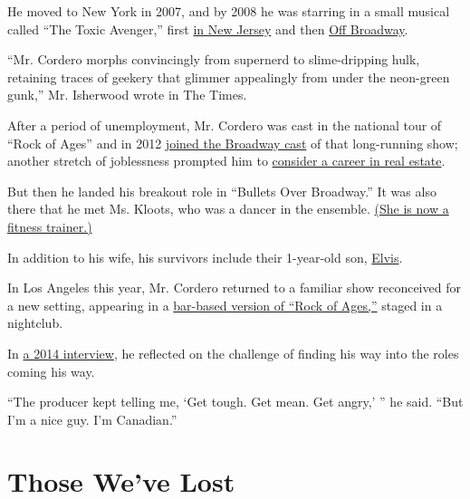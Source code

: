 He moved to New York in 2007, and by 2008 he was starring in a small
musical called ``The Toxic Avenger,'' first
\href{https://www.nytimes.com/2008/10/19/nyregion/new-jersey/19theatnj.html}{in
New Jersey} and then
\href{https://www.nytimes.com/2009/04/07/theater/reviews/07toxi.html}{Off
Broadway}.

``Mr. Cordero morphs convincingly from supernerd to slime-dripping hulk,
retaining traces of geekery that glimmer appealingly from under the
neon-green gunk,'' Mr. Isherwood wrote in The Times.

After a period of unemployment, Mr. Cordero was cast in the national
tour of ``Rock of Ages'' and in 2012
\href{https://www.broadwayworld.com/article/ROCK-OF-AGES-Welcomes-Nick-Cordero-to-the-Cast-as-Dennis-924-20120921}{joined
the Broadway cast} of that long-running show; another stretch of
joblessness prompted him to
\href{https://www.broadway.com/buzz/175841/tony-nominated-bullets-star-nick-cordero-on-quitting-school-getting-in-trouble-woody-allens-comedy-tips/}{consider
a career in real estate}.

But then he landed his breakout role in ``Bullets Over Broadway.'' It
was also there that he met Ms. Kloots, who was a dancer in the ensemble.
\href{https://amandakloots.com/}{(She is now a fitness trainer.)}

In addition to his wife, his survivors include their 1-year-old son,
\href{https://www.playbill.com/article/broadways-nick-cordero-and-amanda-kloots-welcome-first-child}{Elvis}.

In Los Angeles this year, Mr. Cordero returned to a familiar show
reconceived for a new setting, appearing in a
\href{https://www.latimes.com/entertainment-arts/story/2020-01-15/rock-of-ages-hollywood-bourbon-room}{bar-based
version of ``Rock of Ages,''} staged in a nightclub.

In \href{https://nyti.ms/1qc1E17}{a 2014 interview}, he reflected on the
challenge of finding his way into the roles coming his way.

``The producer kept telling me, `Get tough. Get mean. Get angry,' '' he
said. ``But I'm a nice guy. I'm Canadian.''

\href{https://www.nytimes.com/interactive/2020/obituaries/people-died-coronavirus-obituaries.html?action=click\&pgtype=Article\&state=default\&region=BELOW_MAIN_CONTENT\&context=covid_obits_promo}{}

\hypertarget{those-weve-lost}{%
\section{Those We've Lost}\label{those-weve-lost}}


